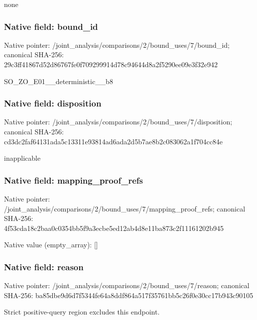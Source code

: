 \documentclass[10pt,a4paper]{article}
\begin{document}
\begingroup\raggedright\sloppy none\par\endgroup

\subsubsection{Native field: bound\_\allowbreak{}id}
Native pointer: /joint\_\allowbreak{}analysis/comparisons/2/bound\_\allowbreak{}uses/7/bound\_\allowbreak{}id; canonical SHA-256: 29c3ff41867d52d86767fe0f709299914d78c94644d8a2f5290ee09e3f32e942

\begingroup\raggedright\sloppy SO\_\allowbreak{}ZO\_\allowbreak{}E01\_\allowbreak{}\_\allowbreak{}deterministic\_\allowbreak{}\_\allowbreak{}b8\par\endgroup

\subsubsection{Native field: disposition}
Native pointer: /joint\_\allowbreak{}analysis/comparisons/2/bound\_\allowbreak{}uses/7/disposition; canonical SHA-256: cd3dc2faf64131ada5c13311e93814ad6ada2d5b7ae8b2c083062a1f704cc84e

\begingroup\raggedright\sloppy inapplicable\par\endgroup

\subsubsection{Native field: mapping\_\allowbreak{}proof\_\allowbreak{}refs}
Native pointer: /joint\_\allowbreak{}analysis/comparisons/2/bound\_\allowbreak{}uses/7/mapping\_\allowbreak{}proof\_\allowbreak{}refs; canonical SHA-256: 4f53cda18c2baa0c0354bb5f9a3ecbe5ed12ab4d8e11ba873c2f11161202b945

Native value (empty\_\allowbreak{}array): []

\subsubsection{Native field: reason}
Native pointer: /joint\_\allowbreak{}analysis/comparisons/2/bound\_\allowbreak{}uses/7/reason; canonical SHA-256: ba85dbe9d6d7f5344fe64a8ddf864a517f35761bb5c26f0e30cc17b943c90105

\begingroup\raggedright\sloppy Strict positive-query region excludes this endpoint.\par\endgroup
\end{document}
